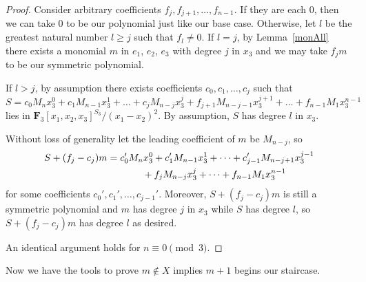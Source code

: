\documentclass[11pt]{article}
\numberwithin{equation}{section}
\theoremstyle{definition}
\numberwithin{equation}{section}
\begin{document}
\begin{proof}
 Consider arbitrary coefficients $f_{j}, f_{j+1},\ldots, f_{n-1}$. If they are each $0$, then we can take $0$ to be our polynomial just like our base case. Otherwise, let $l$ be the greatest natural number $l\geq j$ such that $f_l\neq 0$. If $l=j$, by Lemma~\ref{monAll} there exists a monomial $m$ in $e_1$, $e_2$, $e_3$ with degree $j$ in $x_3$ and we may take $f_jm$ to be our symmetric polynomial.

 If $l>j$, by assumption there exists coefficients $c_0,c_1,\dots,c_j$ such that
 \[S=c_0M_nx_3^0+c_1M_{n-1}x_3^1+\dots + c_{j}M_{n-j}x_3^{j}+f_{j+1}M_{n-j-1}x_3^{j+1}+\dots + f_{n-1}M_1x_3^{n-1}\]
 lies in $\mathbf{F}_3[x_1,x_2,x_3]^{S_3}/(x_1-x_2)^2$. By assumption, $S$ has degree $l$ in $x_3$.

 Without loss of generality let the leading coefficient of $m$ be $M_{n-j}$, so
 \begin{gather*}
 S+(f_j-c_j)m=c_0'M_nx_3^0+c_1'M_{n-1}x_3^1+\dots + c_{j-1}'M_{n-j+1}x_3^{j-1}\\
 \hphantom{S+(f_j-c_j)m=}{} +f_{j}M_{n-j}x_3^{j}+\dots + f_{n-1}M_1x_3^{n-1}\
 \end{gather*}
 for some coefficients $c_0',c_1',\ldots, c_{j-1}'$. Moreover, $S+(f_j-c_j)m$ is still a symmetric polynomial and $m$ has degree $j$ in $x_3$ while $S$ has degree $l$, so $S+(f_j-c_j)m$ has degree $l$ as desired.

 An identical argument holds for $n\equiv 0\pmod{3}$.
\end{proof}

Now we have the tools to prove $m\not\in X$ implies $m+1$ begins our staircase.
\end{document}
